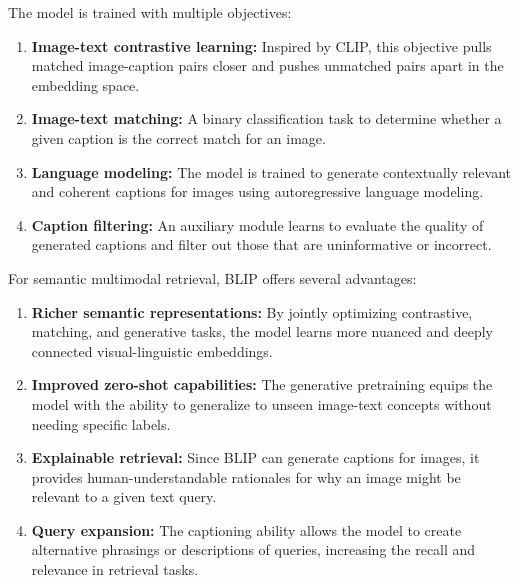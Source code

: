 \documentclass[conference]{IEEEtran}
\begin{document}
\begin{enumerate}
The model is trained with multiple objectives:

\begin{enumerate}
    \item \textbf{Image-text contrastive learning:} Inspired by CLIP, this objective pulls matched image-caption pairs closer and pushes unmatched pairs apart in the embedding space.
    
    \item \textbf{Image-text matching:} A binary classification task to determine whether a given caption is the correct match for an image.
    
    \item \textbf{Language modeling:} The model is trained to generate contextually relevant and coherent captions for images using autoregressive language modeling.
    
    \item \textbf{Caption filtering:} An auxiliary module learns to evaluate the quality of generated captions and filter out those that are uninformative or incorrect.
\end{enumerate}

For semantic multimodal retrieval, BLIP offers several advantages:

\begin{enumerate}
    \item \textbf{Richer semantic representations:} By jointly optimizing contrastive, matching, and generative tasks, the model learns more nuanced and deeply connected visual-linguistic embeddings.
    
    \item \textbf{Improved zero-shot capabilities:} The generative pretraining equips the model with the ability to generalize to unseen image-text concepts without needing specific labels.
    
    \item \textbf{Explainable retrieval:} Since BLIP can generate captions for images, it provides human-understandable rationales for why an image might be relevant to a given text query.
    
    \item \textbf{Query expansion:} The captioning ability allows the model to create alternative phrasings or descriptions of queries, increasing the recall and relevance in retrieval tasks.
\end{enumerate}


\end{enumerate}
\end{document}
